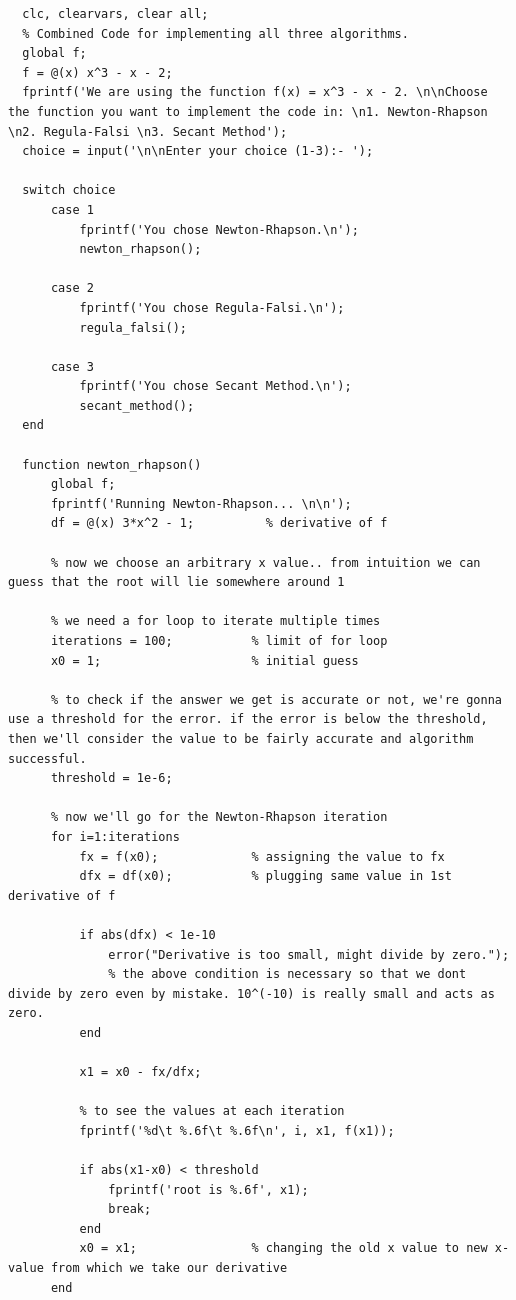 \documentclass[12pt]{report}
\begin{document}
  \begin{lstlisting}
  clc, clearvars, clear all;
  % Combined Code for implementing all three algorithms.
  global f;
  f = @(x) x^3 - x - 2;
  fprintf('We are using the function f(x) = x^3 - x - 2. \n\nChoose the function you want to implement the code in: \n1. Newton-Rhapson \n2. Regula-Falsi \n3. Secant Method');
  choice = input('\n\nEnter your choice (1-3):- ');

  switch choice
      case 1
          fprintf('You chose Newton-Rhapson.\n');
          newton_rhapson();

      case 2
          fprintf('You chose Regula-Falsi.\n');
          regula_falsi();

      case 3
          fprintf('You chose Secant Method.\n');
          secant_method();
  end

  function newton_rhapson()
      global f;
      fprintf('Running Newton-Rhapson... \n\n');
      df = @(x) 3*x^2 - 1;          % derivative of f

      % now we choose an arbitrary x value.. from intuition we can guess that the root will lie somewhere around 1
      
      % we need a for loop to iterate multiple times
      iterations = 100;           % limit of for loop
      x0 = 1;                     % initial guess
      
      % to check if the answer we get is accurate or not, we're gonna use a threshold for the error. if the error is below the threshold, then we'll consider the value to be fairly accurate and algorithm successful.
      threshold = 1e-6;
      
      % now we'll go for the Newton-Rhapson iteration
      for i=1:iterations
          fx = f(x0);             % assigning the value to fx
          dfx = df(x0);           % plugging same value in 1st derivative of f
        
          if abs(dfx) < 1e-10
              error("Derivative is too small, might divide by zero.");
              % the above condition is necessary so that we dont divide by zero even by mistake. 10^(-10) is really small and acts as zero.
          end
      
          x1 = x0 - fx/dfx;
      
          % to see the values at each iteration
          fprintf('%d\t %.6f\t %.6f\n', i, x1, f(x1));
      
          if abs(x1-x0) < threshold
              fprintf('root is %.6f', x1);
              break;
          end
          x0 = x1;                % changing the old x value to new x-value from which we take our derivative
      end
      

\end{lstlisting}
\end{document}
